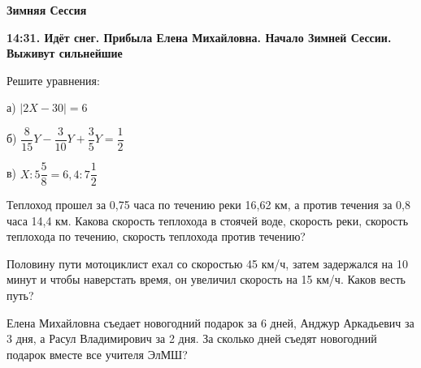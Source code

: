 \centerline{\bf \Huge Зимняя Сессия}
\centerline{\bf \Huge }

\begin{flushright}
        \scriptsize{\textbf{14:31. Идёт снег. Прибыла Елена Михайловна. Начало Зимней Сессии. Выживут сильнейшие}}
\end{flushright}

 Решите уравнения:

а) $|2X-30|=6$

б) $\dfrac{8}{15}Y - \dfrac{3}{10}Y + \dfrac{3}{5}Y = \dfrac{1}{2}$

в) $X : 5\dfrac{5}{8} = 6,4 : 7\dfrac{1}{2}$

 Теплоход прошел за 0,75 часа по течению реки 16,62 км, а против течения за 0,8 часа 14,4 км. Какова скорость теплохода в стоячей воде, скорость реки, скорость теплохода по течению, скорость теплохода против течению?

 Половину пути мотоциклист ехал со скоростью 45 км/ч, затем задержался на 10 минут и чтобы наверстать время, он увеличил скорость на 15 км/ч. Каков весть путь?

 Елена Михайловна съедает новогодний подарок за 6 дней, Анджур Аркадьевич за 3 дня, а Расул Владимирович за 2 дня. За сколько дней съедят новогодний подарок вместе все учителя ЭлМШ?